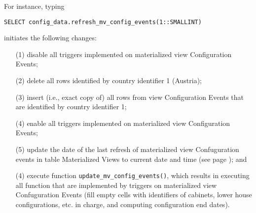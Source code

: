 For instance, typing 
\begin{lstlisting}[language=postgreSQL]
SELECT config_data.refresh_mv_config_events(1::SMALLINT)
\end{lstlisting}
initiates the following changes:
\begin{itemize}
\item[(1)]{disable all triggers implemented on materialized view Configuration Events;}
\item[(2)]{delete all rows identified by country identifier 1 (Austria);}
\item[(3)]{insert (i.e., exact copy of) all rows from view Configuration Events that are identified by country identifier 1;}
\item[(4)]{enable all triggers implemented on materialized view Configuration Events;}
\item[(5)]{update the date of the last refresh of materialized view Confuguration events in table Materialized Views to current date and time (see page \pageref{table_Materialized_Views}); and}
\item[(4)]{execute function \texttt{\footnotesize update\_mv\_config\_events()}, which results in executing all function that are implemented by triggers on materialized view Confuguration Events (fill empty cells with identifiers of cabinets, lower house configurations, etc. in charge, and computing configuration end dates).}
\end{itemize}




